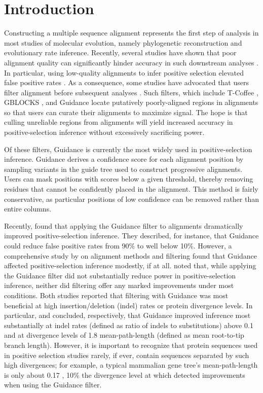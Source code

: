 \documentclass[10pt]{article}
\begin{document}
\section*{Introduction}
Constructing a multiple sequence alignment represents the first step of analysis in most studies of molecular evolution, namely phylogenetic reconstruction and evolutionary rate inference. Recently, several studies have shown that poor alignment quality can significantly hinder accuracy in such downstream analyses \citep{Ogden2006, Talavera2007, Dwivedi2009, MarkovaRaina2011, Jordan2012}. In particular, using low-quality alignments to infer positive selection elevated false positive rates \citep{Schneider2009, Fletcher2010, MarkovaRaina2011}. As a consequence, some studies have advocated that users filter alignment before subsequent analyses \citep{Jordan2012,Privman2012}. Such filters, which include T-Coffee \citep{Notredame2000}, GBLOCKS \citep{Castresana2000}, and Guidance \citep{Penn2010, Privman2012} locate putatively poorly-aligned regions in alignments so that users can curate their alignments to maximize signal. The hope is that culling unreliable regions from alignments will yield increased accuracy in positive-selection inference without excessively sacrificing power.

Of these filters, Guidance \citep{Penn2010,Privman2012} is currently the most widely used in positive-selection inference. Guidance derives a confidence score for each alignment position by sampling variants in the guide tree used to construct progressive alignments. Users can mask positions with scores below a given threshold, thereby removing residues that cannot be confidently placed in the alignment. This method is fairly conservative, as particular positions of low confidence can be removed rather than entire columns. 

Recently, \citet{Privman2012} found that applying the Guidance filter to alignments dramatically improved positive-selection inference. They described, for instance, that Guidance could reduce false positive rates from 90\% to well below 10\%. However, a comprehensive study by \citet{Jordan2012} on alignment methods and filtering found that Guidance affected positive-selection inference modestly, if at all. \citet{Jordan2012} noted that, while applying the Guidance filter did not substantially reduce power in positive-selection inference, neither did filtering offer any marked improvements under most conditions. Both studies reported that filtering with Guidance was most beneficial at high insertion/deletion (indel) rates or protein divergence levels. In particular, \citet{Privman2012} and \citet{Jordan2012} concluded, respectively, that Guidance improved inference most substantially at indel rates (defined as ratio of indels to substitutions) above 0.1 and at divergence levels of 1.8 mean-path-length (defined as mean root-to-tip branch length). However, it is important to recognize that protein sequences used in positive selection studies rarely, if ever, contain sequences separated by such high divergences; for example, a typical mammalian gene tree's mean-path-length is only about 0.17 \citep{Spielman2013}, 10\% the divergence level at which \citet{Jordan2012} detected improvements when using the Guidance filter.
\end{document}
